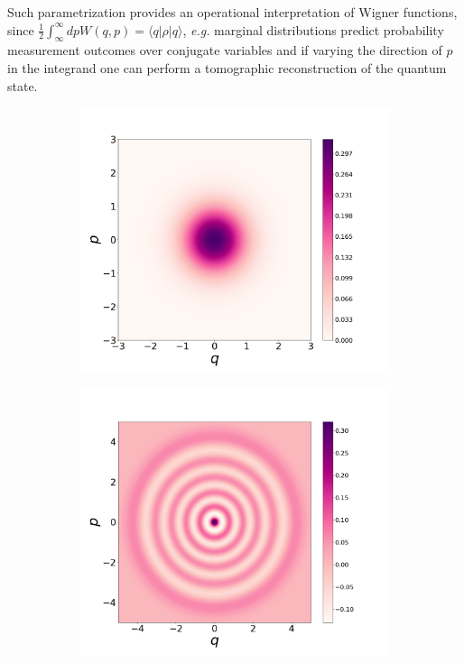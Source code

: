 Such parametrization provides an operational interpretation of Wigner functions, since $\frac{1}{2}\int_\infty^\infty dp W(q,p)= \langle q |\rho |q\rangle$, \textit{e.g.} marginal distributions predict probability measurement outcomes over conjugate variables and if varying the direction of $p$ in the integrand one can perform a tomographic reconstruction of the quantum state.
\begin{figure}[t!]
\centering
    \begin{subfigure}[b]{0.49\textwidth}
        \centering
        \includegraphics[width=1.\textwidth]{Figures/some_wigners/vacuum.png}
    \end{subfigure}
    \hfill
    \begin{subfigure}[b]{0.49\textwidth}
        \centering
        \includegraphics[width=1.\textwidth]{Figures/some_wigners/fock5.png}

\end{subfigure}
\end{figure}
